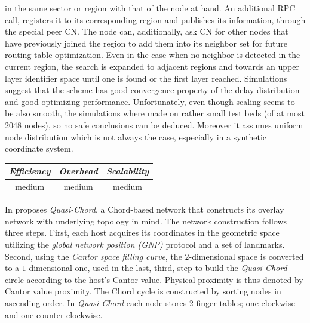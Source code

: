in the same sector or region with that of the node at hand. An additional RPC
call, registers it to its corresponding region and publishes its information,
through the special peer CN. The node can, additionally, ask CN for other
nodes that have previously joined the region to add them into its
neighbor set for future routing table optimization. Even in the case when no
neighbor is detected in the current region, the search is expanded to adjacent
regions and towards an upper layer identifier space until one is found or the
first layer reached. Simulations suggest that the scheme has good convergence
property of the delay distribution and good optimizing performance.
Unfortunately, even though scaling seems to be also smooth, the simulations
where made on rather small test beds (of at most 2048 nodes), so no safe
conclusions can be deduced. Moreover it assumes uniform node distribution which
is not always the case, especially in a synthetic coordinate system.\\

\begin{center}
\begin{tabular}{ccc}
\emph{Efficiency} & \emph{Overhead} & \emph{Scalability} \\
\hline
%
medium &
%
medium &
%
medium
\end{tabular}
\end{center}

In \cite{SZ2008} proposes \emph{Quasi-Chord}, a Chord-based network that
constructs its overlay network with underlying topology in mind. The network
construction follows three steps. First, each host acquires its coordinates in
the geometric space utilizing the \emph{global network position (GNP)} protocol
\cite{ng_gnp_2001} and a set of landmarks.
Second, using the \emph{Cantor space filling curve}, the $2$-dimensional space
is converted to a $1$-dimensional one, used in the last, third, step to build
the \emph{Quasi-Chord} circle according to the host's Cantor value. Physical
proximity is thus denoted by Cantor value proximity. The Chord cycle is
constructed by sorting nodes in ascending order. In \emph{Quasi-Chord}
each node stores 2 finger tables; one clockwise and one counter-clockwise.

